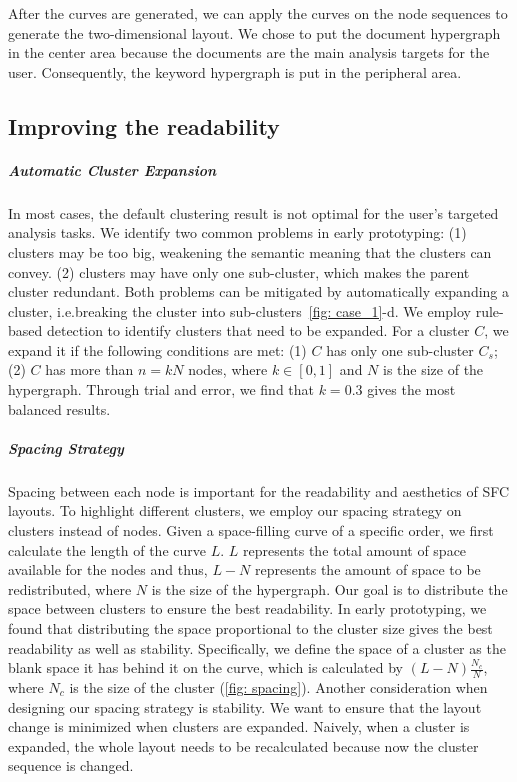 After the curves are generated, we can apply the curves on the node sequences to generate the two-dimensional layout.
We chose to put the document hypergraph in the center area because the documents are the main analysis targets for the user.
Consequently, the keyword hypergraph is put in the peripheral area.

\subsection{Improving the readability}
\subparagraph*{Automatic Cluster Expansion}
In most cases, the default clustering result is not optimal for the user's targeted analysis tasks.
We identify two common problems in early prototyping: 
(1) clusters may be too big, weakening the semantic meaning that the clusters can convey.
(2) clusters may have only one sub-cluster, which makes the parent cluster redundant. 
Both problems can be mitigated by automatically expanding a cluster, i.e.breaking the cluster into sub-clusters~\autoref{fig: case_1}-d.
We employ rule-based detection to identify clusters that need to be expanded.
For a cluster $C$, we expand it if the following conditions are met:
(1) $C$ has only one sub-cluster $C_s$;
(2) $C$ has more than $n = k N$ nodes, where $k \in [0, 1]$ and $N$ is the size of the hypergraph.
Through trial and error, we find that $k=0.3$ gives the most balanced results.
\vspace*{-0.3cm}
\subparagraph*{Spacing Strategy}
Spacing between each node is important for the readability and aesthetics of SFC layouts.
To highlight different clusters, we employ our spacing strategy on clusters instead of nodes.
Given a space-filling curve of a specific order, we first calculate the length of the curve $L$.
$L$ represents the total amount of space available for the nodes and thus,
$L - N$ represents the amount of space to be redistributed, where $N$ is the size of the hypergraph.
Our goal is to distribute the space between clusters to ensure the best readability.
In early prototyping, we found that distributing the space proportional to the cluster size gives the best readability as well as stability.
Specifically, we define the space of a cluster as the blank space it has behind it on the curve, which is calculated by $(L-N)\frac{N_c}{N}$, where $N_c$ is the size of the cluster (\autoref{fig: spacing}).
Another consideration when designing our spacing strategy is stability.
We want to ensure that the layout change is minimized when clusters are expanded.
Naively, when a cluster is expanded, the whole layout needs to be recalculated because now the cluster sequence is changed.

